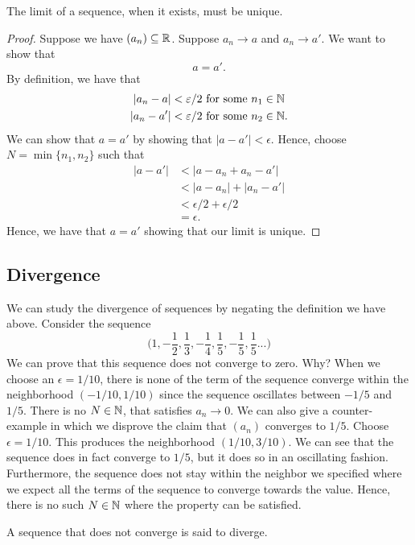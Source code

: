 \begin{theorem}
The limit of a sequence, when it exists, must be unique.
\end{theorem}

\begin{proof}
Suppose we have \( (a_n) \subseteq \mathbb{R} \). Suppose \( a_n \to a \) and \( a_n \to a' \). We want to show that 
\[ a = a' .  \]
By definition, we have that 
\begin{align*}
    |a_n - a |&< \varepsilon/2   \text{ for some } n_1 \in \mathbb{N} \\
    |a_n - a'| &< \varepsilon/2 \text{ for some } n_2 \in \mathbb{N} .
\end{align*}
We can show that \( a = a' \) by showing that \( |a - a'| < \epsilon\). Hence, choose \( N = \min \{ n_1, n_2 \}\) such that 
\begin{align*}
 |a - a'|&< |a - a_n + a_n - a' |  \\
         &< |a - a_n | + |a_n - a'| \\
         &< \epsilon/2 + \epsilon/2 \\
         &= \epsilon.
\end{align*}
Hence, we have that \( a = a' \) showing that our limit is unique. 
\end{proof}



\subsection{Divergence}

We can study the divergence of sequences by negating the definition we have above. 
Consider the sequence 
\[ \Big(1, -\frac{1}{2}, \frac{1}{3}, -\frac{1}{4}, \frac{1}{5}, -\frac{1}{5}, \frac{1}{5}...  \Big)\]
We can prove that this sequence does not converge to zero. Why? When we choose an \( \epsilon  = 1/10 \), there is none of the term of the sequence converge within the neighborhood \( (-1/10, 1/10 )\) since the sequence oscillates between \(-1 / 5 \)  and \( 1 / 5\). There is no \( N \in \mathbb{N} \), that satisfies \( a_n \to 0 \). We can also give a counter-example in which we disprove the claim that \( (a_n) \) converges to \( 1 / 5 \). Choose \( \epsilon = 1 / 10 \). This produces the neighborhood \( (1/10, 3/10 ) \). We can see that the sequence does in fact converge to \( 1 / 5 \), but it does so in an oscillating fashion. Furthermore, the sequence does not stay within the neighbor we specified where we expect all the terms of the sequence to converge towards the value. Hence, there is no such \( N \in \mathbb{N} \) where the property can be satisfied.  


\begin{definition}
A sequence that does not converge is said to diverge.
\end{definition}


